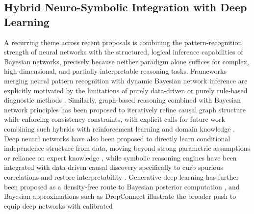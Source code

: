 \subsection{Hybrid Neuro-Symbolic Integration with Deep Learning}
A recurring theme across recent proposals is combining the pattern-recognition strength of neural networks with the structured, logical inference capabilities of Bayesian networks, precisely because neither paradigm alone suffices for complex, high-dimensional, and partially interpretable reasoning tasks. Frameworks merging neural pattern recognition with dynamic Bayesian network inference are explicitly motivated by the limitations of purely data-driven or purely rule-based diagnostic methods \cite{zhang2026neuro}. Similarly, graph-based reasoning combined with Bayesian network principles has been proposed to iteratively refine causal graph structure while enforcing consistency constraints, with explicit calls for future work combining such hybrids with reinforcement learning and domain knowledge \cite{zhang2026graph}. Deep neural networks have also been proposed to directly learn conditional independence structure from data, moving beyond strong parametric assumptions or reliance on expert knowledge \cite{zhang2026causalo}, while symbolic reasoning engines have been integrated with data-driven causal discovery specifically to curb spurious correlations and restore interpretability \cite{zhang2026adaptive}. Generative deep learning has further been proposed as a density-free route to Bayesian posterior computation \cite{polson2023generative}, and Bayesian approximations such as DropConnect illustrate the broader push to equip deep networks with calibrated

